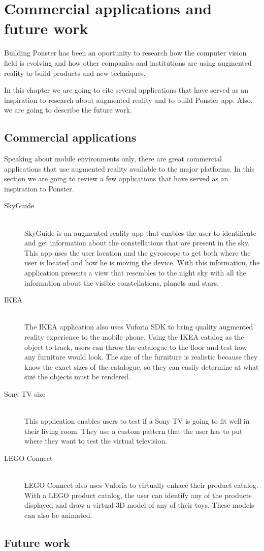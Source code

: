 \chapter{Commercial applications and future work}
Building Ponster has been an oportunity to research how the computer vision field is
evolving and how other companies and institutions are using augmented reality to
build products and new techniques. 

In this chapter we are going to cite several applications that have served as an
inspiration to research about augmented reality and to build Ponster app. Also, we
are going to describe the future work.

\section{Commercial applications}
Speaking about mobile environments only, there are great commercial applications
that use augmented reality available to the major platforms. In this section we are
going to review a few applications that have served as an inspiration to Ponster.

\begin{description}
\item [SkyGuide] \hfill \\
SkyGuide is an augmented reality app that enables the user to identificate and get
information about the constellations that are present in the sky. This app uses the
user location and the gyroscope to get both where the user is located and how he is
moving the device. With this information, the application presents a view that
resembles to the night sky with all the information about the visible
constellations, planets and stars.

\item [IKEA] \hfill \\
The IKEA application also uses Vuforia SDK to bring quality augmented reality
experience to the mobile phone. Using the IKEA catalog as the object to track, users
can throw the catalogue to the floor and test how any furniture would look. The size
of the furniture is realistic because they know the exact sizes of the catalogue, so
they can easily determine at what size the objects must be rendered.

\item [Sony TV size] \hfill \\
This application enables users to test if a Sony TV is going to fit well in their
living room. They use a custom pattern that the user has to put where they want to
test the virtual television.

\item [LEGO Connect] \hfill \\
LEGO Connect also uses Vuforia to virtually enhace their product catalog. With a
LEGO product catalog, the user can identify any of the products displayed and draw a
virtual 3D model of any of their toys. These models can also be animated.
\end{description}

\section{Future work}
